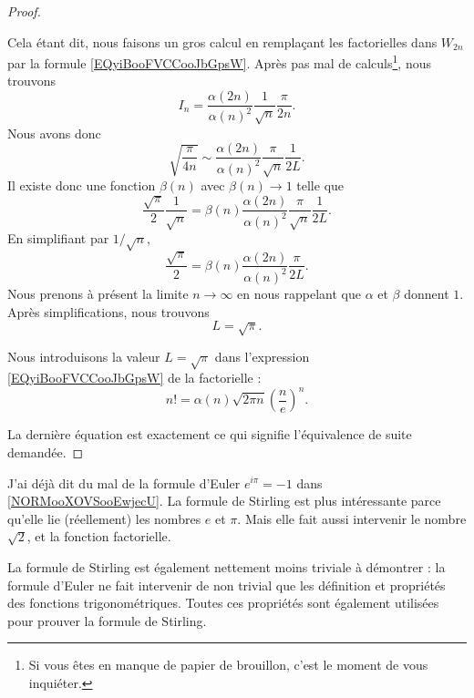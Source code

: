 \begin{proof}
\begin{subproof}
		Cela étant dit, nous faisons un gros calcul en remplaçant les factorielles dans \( W_{2n}\) par la formule \eqref{EQyiBooFVCCooJbGpsW}. Après pas mal de calculs\footnote{Si vous êtes en manque de papier de brouillon, c'est le moment de vous inquiéter.}, nous trouvons
		\begin{equation}
			I_n=\frac{ \alpha(2n) }{ \alpha(n)^2 }\frac{1}{ \sqrt{ n } }\frac{ \pi }{ 2n }.
		\end{equation}
		Nous avons donc
		\begin{equation}
			\sqrt{ \frac{ \pi }{ 4n } }\sim \frac{ \alpha(2n) }{ \alpha(n)^2 }\frac{ \pi }{ \sqrt{ n } }\frac{1}{ 2L }.
		\end{equation}
		Il existe donc une fonction \( \beta(n)\) avec \( \beta(n)\to 1\) telle que
		\begin{equation}
			\frac{ \sqrt{ \pi } }{2}\frac{1}{ \sqrt{ n } }=\beta(n)\frac{ \alpha(2n) }{ \alpha(n)^2 }\frac{ \pi }{ \sqrt{ n } }\frac{1}{ 2L }.
		\end{equation}
		En simplifiant par \( 1/\sqrt{ n }\),
		\begin{equation}
			\frac{ \sqrt{ \pi } }{2}=\beta(n)\frac{ \alpha(2n) }{ \alpha(n)^2 }\frac{\pi}{ 2L }.
		\end{equation}
		Nous prenons à présent la limite \( n\to \infty\) en nous rappelant que \( \alpha\) et \( \beta \) donnent \( 1\). Après simplifications, nous trouvons
		\begin{equation}
			L=\sqrt{ \pi }.
		\end{equation}

		\spitem[La fin]
		Nous introduisons la valeur \( L=\sqrt{ \pi }\) dans l'expression \eqref{EQyiBooFVCCooJbGpsW} de la factorielle :
		\begin{equation}
			n!=\alpha(n)\sqrt{ 2\pi n }\left( \frac{ n }{ e } \right)^n.
		\end{equation}
	\end{subproof}
	La dernière équation est exactement ce qui signifie l'équivalence de suite demandée.
\end{proof}

\begin{normaltext}
	J'ai déjà dit du mal de la formule d'Euler \( e^{i\pi}=-1\) dans \eqref{NORMooXOVSooEwjecU}. La formule de Stirling est plus intéressante parce qu'elle lie (réellement) les nombres \( e\) et \( \pi\). Mais elle fait aussi intervenir le nombre \( \sqrt{ 2 }\), et la fonction factorielle.

	La formule de Stirling est également nettement moins triviale à démontrer : la formule d'Euler ne fait intervenir de non trivial que les définition et propriétés des fonctions trigonométriques. Toutes ces propriétés sont également utilisées pour prouver la formule de Stirling.
\end{normaltext}

